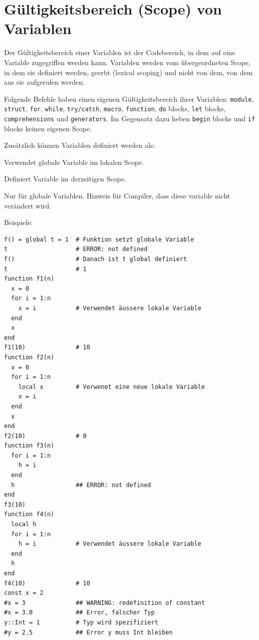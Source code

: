 \documentclass[10pt,twocolumn]{scrartcl}
\begin{document}
\section{Gültigkeitsbereich (Scope) von Variablen}
\label{sec:scopeVonVariable}

Der Gültigkeitsbereich einer Variablen ist der Codebereich, in dem auf eine
Variable zugegriffen werden kann. Variablen werden vom übergeordneten Scope, in dem sie definiert werden, geerbt (lexical scoping) und nicht von dem, von dem aus sie aufgerufen werden.

Folgende Befehle haben einen eigenen
Gültigkeitsbereich ihrer Variablen:
\lstinline|module|,
\lstinline|struct|,
\lstinline|for|,
\lstinline|while|,
\lstinline|try/catch|,
\lstinline|macro|,
\lstinline|function|,
\lstinline|do| blocks,
\lstinline|let| blocks,
\lstinline|comprehensions| und
\lstinline|generators|.
Im Gegensatz dazu heben \lstinline|begin| blocks und \lstinline|if| blocks
keinen eigenen Scope.

Zusätzlich können Variablen definiert werden als:
\begin{description}[style=multiline,leftmargin=1.3cm,nolistsep]
  \item[global] Verwendet globale Variable im lokalen Scope.
  \item[local] Definiert Variable im derzeitigen Scope.
  \item[const] Nur für globale Variablen. Hinweis für Compiler, dass diese
    variable nicht verändert wird.
\end{description}

Beispiele:
\begin{lstlisting}
f() = global t = 1  # Funktion setzt globale Variable
t                   # ERROR: not defined
f()                 # Danach ist t global definiert
t                   # 1
function f1(n)
  x = 0
  for i = 1:n
    x = i           # Verwendet äussere lokale Variable
  end
  x
end
f1(10)              # 10
function f2(n)
  x = 0
  for i = 1:n
    local x         # Verwenet eine neue lokale Variable
    x = i
  end
  x
end
f2(10)              # 0
function f3(n)
  for i = 1:n
    h = i
  end
  h                 ## ERROR: not defined
end
f3(10)
function f4(n)
  local h
  for i = 1:n
    h = i           # Verwendet äussere lokale Variable
  end
  h
end
f4(10)              # 10
const x = 2
#x = 3              ## WARNING: redefinition of constant
#x = 3.0            ## Error, falscher Typ
y::Int = 1          # Typ wird spezifiziert
#y = 2.5            ## Error y muss Int bleiben
\end{lstlisting}
\end{document}
